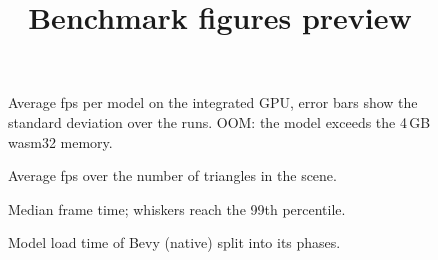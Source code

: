 \documentclass[journal]{IEEEtran}
\begin{document}
\title{Benchmark figures preview}
\maketitle

\begin{table}[!t]
\centering
\caption{Test models, as rendered by Bevy}
\label{tab:models}

\end{table}

\begin{table}[!t]
\centering
\caption{Average and 1\% low fps on the integrated GPU (Intel UHD, 2088$\times$1550, MSAA 4$\times$, shadows), mean $\pm$ standard deviation over five 60-second runs}
\label{tab:fps}
\resizebox{\textwidth}{!}{}
\end{table}

\begin{figure}[!t]
\centering

\caption{Average fps per model on the integrated GPU, error bars show the standard deviation over the runs. OOM: the model exceeds the 4\,GB wasm32 memory.}
\label{fig:fps}
\end{figure}

\begin{figure}[!t]
\centering

\caption{Average fps over the number of triangles in the scene.}
\label{fig:scalability}
\end{figure}

\begin{figure}[!t]
\centering

\caption{Median frame time; whiskers reach the 99th percentile.}
\label{fig:frametimes}
\end{figure}

\begin{figure}[!t]
\centering

\caption{Model load time of Bevy (native) split into its phases.}
\label{fig:load}
\end{figure}

\begin{table}[!t]
\centering
\caption{Welch's $t$-test on average fps per run}
\label{tab:ttest}
\resizebox{\columnwidth}{!}{}
\end{table}

\begin{table}[!t]
\centering
\caption{Total model load time in seconds}
\label{tab:load}
\resizebox{\columnwidth}{!}{}
\end{table}
\end{document}

